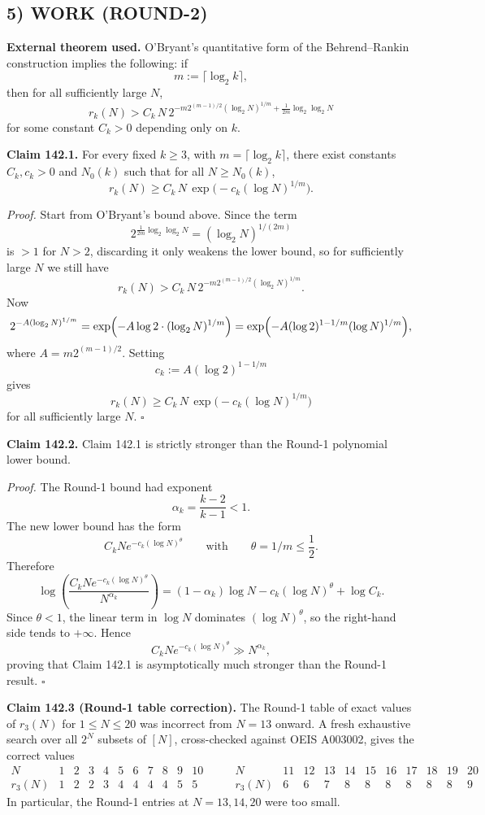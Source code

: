 \subsection*{5) WORK (ROUND-2)}

\medskip
\noindent\textbf{External theorem used.}  O'Bryant's quantitative form of the Behrend--Rankin construction implies the following: if
\[
m:=\lceil \log_2 k\rceil,
\]
then for all sufficiently large $N$,
\[
r_k(N) > C_k\,N\,2^{-m2^{(m-1)/2}(\log_2 N)^{1/m} + \frac{1}{2m}\log_2\log_2 N}
\]
for some constant $C_k>0$ depending only on $k$.

\medskip
\noindent\textbf{Claim 142.1.}  For every fixed $k\ge 3$, with $m=\lceil \log_2 k\rceil$, there exist constants $C_k,c_k>0$ and $N_0(k)$ such that for all $N\ge N_0(k)$,
\[
r_k(N) \ge C_k\,N\,\exp\bigl(-c_k(\log N)^{1/m}\bigr).
\]

\smallskip
\noindent\emph{Proof.}
Start from O'Bryant's bound above.  Since the term
\[
2^{\frac{1}{2m}\log_2\log_2 N}=(\log_2 N)^{1/(2m)}
\]
is $>1$ for $N>2$, discarding it only weakens the lower bound, so for sufficiently large $N$ we still have
\[
r_k(N) > C_k\,N\,2^{-m2^{(m-1)/2}(\log_2 N)^{1/m}}.
\]
Now
\[
2^{-A(\log_2 N)^{1/m}}
=\exp\Bigl(-A\log 2\cdot (\log_2 N)^{1/m}\Bigr)
=\exp\Bigl(-A(\log 2)^{1-1/m}(\log N)^{1/m}\Bigr),
\]
where $A=m2^{(m-1)/2}$.  Setting
\[
c_k:=A(\log 2)^{1-1/m}
\]
gives
\[
r_k(N) \ge C_k\,N\,\exp\bigl(-c_k(\log N)^{1/m}\bigr)
\]
for all sufficiently large $N$.
\hfill$\square$

\medskip
\noindent\textbf{Claim 142.2.}  Claim 142.1 is strictly stronger than the Round-1 polynomial lower bound.

\smallskip
\noindent\emph{Proof.}
The Round-1 bound had exponent
\[
\alpha_k=\frac{k-2}{k-1}<1.
\]
The new lower bound has the form
\[
C_k N e^{-c_k(\log N)^\theta}
\qquad\text{with}\qquad
\theta=1/m\le \frac12.
\]
Therefore
\[
\log\!\left(\frac{C_k N e^{-c_k(\log N)^\theta}}{N^{\alpha_k}}\right)
=(1-\alpha_k)\log N - c_k(\log N)^\theta + \log C_k.
\]
Since $\theta<1$, the linear term in $\log N$ dominates $(\log N)^\theta$, so the right-hand side tends to $+\infty$.  Hence
\[
C_k N e^{-c_k(\log N)^\theta} \gg N^{\alpha_k},
\]
proving that Claim 142.1 is asymptotically much stronger than the Round-1 result.
\hfill$\square$

\medskip
\noindent\textbf{Claim 142.3 (Round-1 table correction).}  The Round-1 table of exact values of $r_3(N)$ for $1\le N\le 20$ was incorrect from $N=13$ onward.  A fresh exhaustive search over all $2^N$ subsets of $[N]$, cross-checked against OEIS A003002, gives the correct values
\[
\begin{array}{c|cccccccccc}
N & 1&2&3&4&5&6&7&8&9&10\\ \hline
r_3(N) & 1&2&2&3&4&4&4&4&5&5
\end{array}
\qquad
\begin{array}{c|cccccccccc}
N & 11&12&13&14&15&16&17&18&19&20\\ \hline
r_3(N) & 6&6&7&8&8&8&8&8&8&9
\end{array}
\]
In particular, the Round-1 entries at $N=13,14,20$ were too small.

